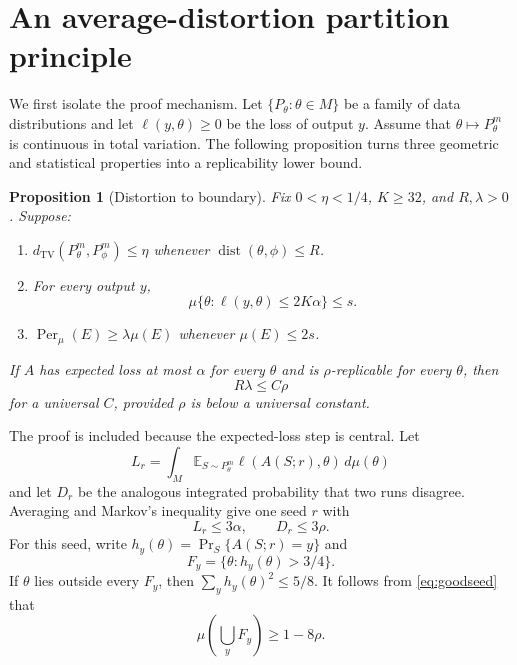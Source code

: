 \documentclass[twoside]{article}
\newtheorem{proposition}[theorem]{Proposition}
\theoremstyle{definition}
\newcommand{\E}{\mathbb E}
\newcommand{\TV}{d_{\mathrm{TV}}}
\newcommand{\1}{\mathbf 1}
\newcommand{\Per}{\operatorname{Per}}
\newcommand{\dist}{\operatorname{dist}}
\begin{document}
\section{An average-distortion partition principle}

We first isolate the proof mechanism. Let $\{P_\theta:\theta\in M\}$ be a family of data distributions and let $\ell(y,\theta)\ge0$ be the loss of output $y$. Assume that $\theta\mapsto P_\theta^m$ is continuous in total variation. The following proposition turns three geometric and statistical properties into a replicability lower bound.

\begin{proposition}[Distortion to boundary]\label{prop:generic}
Fix $0<\eta<1/4$, $K\ge 32$, and $R,\lambda>0$. Suppose:
\begin{enumerate}
 \item $\TV(P_\theta^m,P_\phi^m)\le\eta$ whenever $\dist(\theta,\phi)\le R$.
 \item For every output $y$,
 \begin{equation}
  \mu\{\theta:\ell(y,\theta)\le2K\alpha\}\le s.
  \label{eq:basin}
 \end{equation}
 \item $\Per_\mu(E)\ge\lambda\mu(E)$ whenever $\mu(E)\le2s$.
\end{enumerate}
If $A$ has expected loss at most $\alpha$ for every $\theta$ and is $\rho$-replicable for every $\theta$, then
\begin{equation}
 R\lambda\le C\rho
 \label{eq:generic}
\end{equation}
for a universal $C$, provided $\rho$ is below a universal constant.
\end{proposition}

The proof is included because the expected-loss step is central. Let \[ L_r=\int_M\E_{S\sim P_\theta^m} \ell(A(S;r),\theta)\,d\mu(\theta) \] and let $D_r$ be the analogous integrated probability that two runs disagree. Averaging and Markov's inequality give one seed $r$ with
\begin{equation}
 L_r\le3\alpha,
 \qquad D_r\le3\rho.
 \label{eq:goodseed}
\end{equation}
For this seed, write $h_y(\theta)=\Pr_S\{A(S;r)=y\}$ and \[ F_y=\{\theta:h_y(\theta)>3/4\}. \] If $\theta$ lies outside every $F_y$, then $\sum_yh_y(\theta)^2\le5/8$. It follows from \eqref{eq:goodseed} that
\begin{equation}
 \mu\left(\bigcup_yF_y\right)\ge1-8\rho.
 \label{eq:cover}
\end{equation}
\end{document}
